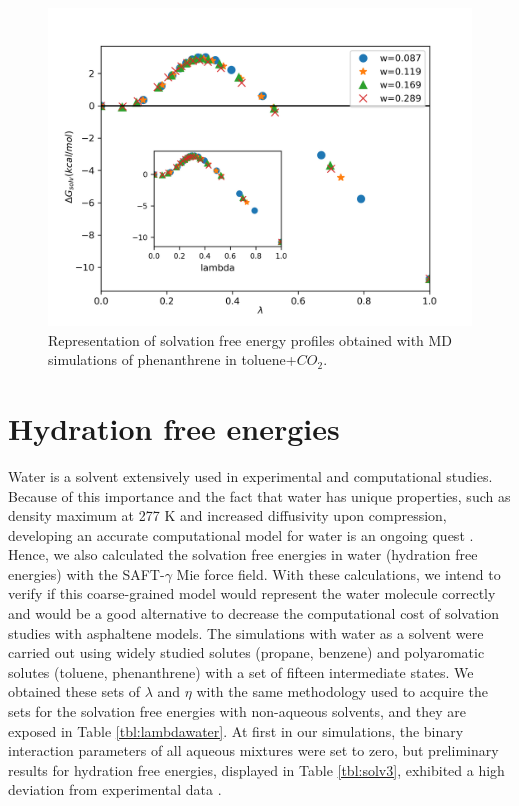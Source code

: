 \begin{figure}[H]
\centering
\includegraphics[width=0.8\linewidth]{Figures/tolco2}
\caption{Representation of solvation free energy profiles obtained with MD simulations of phenanthrene in toluene+$CO_{2}$.}
\label{fig:Figure_1}
\end{figure}


\section{Hydration free energies}

Water is a solvent extensively used in experimental and computational studies. Because of this importance and the fact that water has unique properties, such as density maximum at 277 K and increased diffusivity upon compression, developing an accurate computational model for water is an ongoing quest \cite{hadley2012}. Hence, we also calculated the solvation free energies in water (hydration free energies) with the SAFT-$\gamma$ Mie force field. With these calculations, we intend to verify if this coarse-grained model would represent the water molecule correctly and would be a good alternative to decrease the computational cost of solvation studies with asphaltene models. The simulations with water as a solvent were carried out using widely studied solutes (propane, benzene) and polyaromatic solutes (toluene, phenanthrene) with a set of fifteen intermediate states.  We obtained these sets of $\lambda$ and $\eta$ with the same methodology used to acquire the sets for the solvation free energies with non-aqueous solvents, and they are exposed in Table \ref{tbl:lambdawater}. At first in our simulations, the binary interaction parameters of all aqueous mixtures were set to zero, but preliminary results for hydration free energies, displayed in Table \ref{tbl:solv3},  exhibited a high deviation from experimental data \cite{P29900000291, doi:10.1021/ct050097l}.


